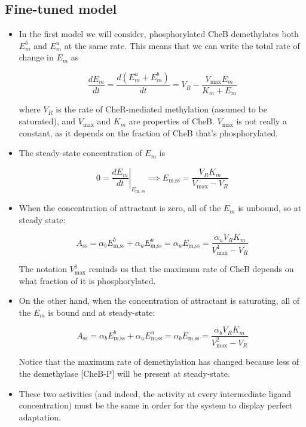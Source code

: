 \documentclass{article}
\begin{document}
\subsection*{Fine-tuned model}
\begin{itemize}
\item In the first model we will consider, phosphorylated CheB demethylates both $E_m^b$ and $E_m^u$ at the same rate. This means that we can write the total rate of change in $E_m$ as

\[ \frac{dE_m}{dt} = \frac{d \left(E_m^u + E_m^b \right)}{dt} = V_R - \frac{ V_{\textrm{max}} E_m}{K_m + E_m}  \]

where $V_R$ is the rate of CheR-mediated methylation (assumed to be saturated), and $V_{\textrm{max}}$ and $K_m$ are properties of CheB. $V_{\textrm{max}}$ is not really a constant, as it depends on the fraction of CheB that's phosphorylated.

\item The steady-state concentration of $E_m$ is

\[ 0 = \left. \frac{dE_m}{dt} \right|_{E_{\textrm{m, ss}}} \implies E_{\textrm{m,ss}} = \frac{V_R K_m}{V_{\textrm{max}} - V_R} \] 

\item When the concentration of attractant is zero, all of the $E_m$ is unbound, so at steady state:

\[ A_{\textrm{ss}} =  \alpha_b E_{\textrm{m,ss}}^b  + \alpha_u E_{\textrm{m,ss}}^u  = \alpha_u E_{\textrm{m,ss}} = \frac{ \alpha_u  V_R K_m}{V_{\textrm{max}}^1 - V_R} \]

The notation $V_{\textrm{max}}^1$ reminds us that the maximum rate of CheB depends on what fraction of it is phosphorylated.

\item On the other hand, when the concentration of attractant is saturating, all of the $E_m$ is bound and at steady-state:

\[ A_{\textrm{ss}} = \alpha_b E_{\textrm{m,ss}}^b + \alpha_u E_{\textrm{m,ss}}^u  = \alpha_b E_{\textrm{m,ss}} = \frac{ \alpha_b  V_R K_m}{V_{\textrm{max}}^2 - V_R} \]

Notice that the maximum rate of demethylation has changed because less of the demethylase [CheB-P] will be present at steady-state.

\item These two activities (and indeed, the activity at every intermediate ligand concentration) must be the same in order for the system to display perfect adaptation.


\end{itemize}
\end{document}
